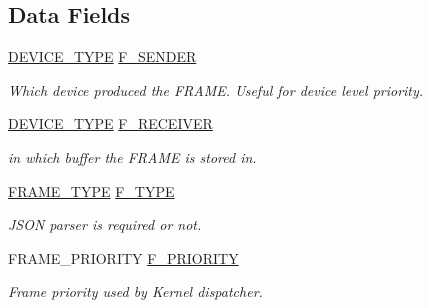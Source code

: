 \subsection*{Data Fields}
\begin{DoxyCompactItemize}
\item 
\mbox{\label{struct_k_e_r_n_e_l___f_r_a_m_e_af979252e2c7fa6f78f4cfda607e7587b}} 
\hyperlink{_kernel_8h_add57988c892c423bff906e04292510df}{D\+E\+V\+I\+C\+E\+\_\+\+T\+Y\+PE} \hyperlink{struct_k_e_r_n_e_l___f_r_a_m_e_af979252e2c7fa6f78f4cfda607e7587b}{F\+\_\+\+S\+E\+N\+D\+ER}
\begin{DoxyCompactList}\small\item\em Which device produced the F\+R\+A\+ME. Useful for device level priority. \end{DoxyCompactList}\item 
\mbox{\label{struct_k_e_r_n_e_l___f_r_a_m_e_ae2d1e98376527216fa6ff53b940a7c7a}} 
\hyperlink{_kernel_8h_add57988c892c423bff906e04292510df}{D\+E\+V\+I\+C\+E\+\_\+\+T\+Y\+PE} \hyperlink{struct_k_e_r_n_e_l___f_r_a_m_e_ae2d1e98376527216fa6ff53b940a7c7a}{F\+\_\+\+R\+E\+C\+E\+I\+V\+ER}
\begin{DoxyCompactList}\small\item\em in which buffer the F\+R\+A\+ME is stored in. \end{DoxyCompactList}\item 
\mbox{\label{struct_k_e_r_n_e_l___f_r_a_m_e_ae24624f2af7ede4b38b487a23cf5c947}} 
\hyperlink{_kernel_8h_ae7bbafd20fabd9f3e1a4d5563f587487}{F\+R\+A\+M\+E\+\_\+\+T\+Y\+PE} \hyperlink{struct_k_e_r_n_e_l___f_r_a_m_e_ae24624f2af7ede4b38b487a23cf5c947}{F\+\_\+\+T\+Y\+PE}
\begin{DoxyCompactList}\small\item\em J\+S\+ON parser is required or not. \end{DoxyCompactList}\item 
\mbox{\label{struct_k_e_r_n_e_l___f_r_a_m_e_a3d27a4b137640aaa3b112a0c236bf934}} 
F\+R\+A\+M\+E\+\_\+\+P\+R\+I\+O\+R\+I\+TY \hyperlink{struct_k_e_r_n_e_l___f_r_a_m_e_a3d27a4b137640aaa3b112a0c236bf934}{F\+\_\+\+P\+R\+I\+O\+R\+I\+TY}
\begin{DoxyCompactList}\small\item\em Frame priority used by Kernel dispatcher. \end{DoxyCompactList}\item 

\end{DoxyCompactItemize}
